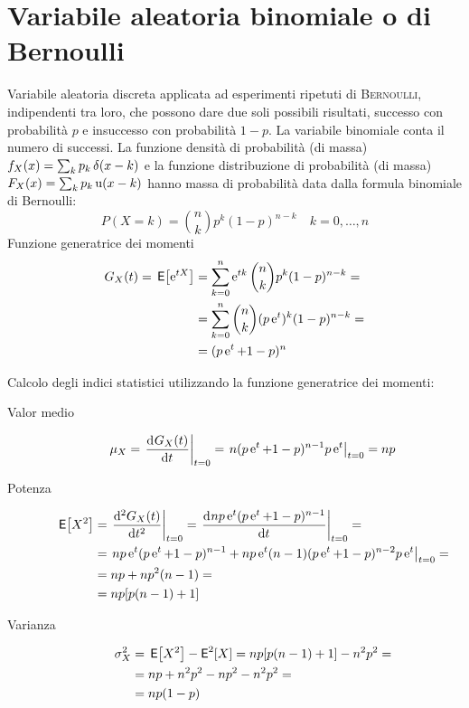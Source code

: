 \section{Variabile aleatoria binomiale o di Bernoulli}
Variabile aleatoria discreta applicata ad esperimenti ripetuti di \textsc{Bernoulli}, indipendenti tra loro, che possono dare due soli possibili risultati, successo con probabilità $p$ e insuccesso con probabilità $1-p$. La variabile binomiale conta il numero di successi.
La funzione densità di probabilità (di massa) $f_X(x)=\sum_k p_k \impulse(x-k)$ e la funzione distribuzione di probabilità (di massa) $F_X(x)=\sum_k p_k \step(x-k)$ hanno massa di probabilità data dalla formula binomiale di Bernoulli:
\begin{equation}
	P(X=k)=\binom{n}{k} p^k (1-p)^{n-k}\quad k=0,\dots,n
\end{equation}
Funzione generatrice dei momenti
\begin{equation}
\begin{split}
	G_X(t)=\E{\e{t X}}&=\sum_{k=0}^{n}{\e{t k}\binom{n}{k}p^k(1-p)^{n-k}}=\\
	&=\sum_{k=0}^{n}{\binom{n}{k}(p\e{t})^k(1-p)^{n-k}}=\\
	&=(p\e{t}+1-p)^n
	\end{split}
\end{equation}
\begin{flushleft}
Calcolo degli indici statistici utilizzando la funzione generatrice dei momenti:
\end{flushleft}
\begin{description}
\item[Valor medio]
\begin{equation}
	\mu_X=\restrict{\deriv{G_X(t)}{t}}{t=0}=\restrict{n(p\e{t}+1-p)^{n-1}p\e{t}}{t=0}=n p
\end{equation}
\item[Potenza]
\begin{equation}
\begin{split}
	\E{X^2}&=\restrict{\deriv[2]{G_X(t)}{t}}{t=0}=\restrict{\deriv{np\e{t}(p\e{t}+1-p)^{n-1}}{t}}{t=0}=\\
	&=\restrict{np\e{t}(p\e{t}+1-p)^{n-1}+np\e{t}(n-1)(p\e{t}+1-p)^{n-2}p\e{t}}{t=0}=\\
	&=np+np^2(n-1)=\\
	&=np[p(n-1)+1]
\end{split}
\end{equation}
\item[Varianza]
\begin{equation}
\begin{split}
	\sigma^2_X&=\E{X^2}-\Esp^2[X]=np[p(n-1)+1]-n^2p^2=\\
	&=np+n^2p^2-np^2-n^2p^2=\\
	&=np(1-p)
\end{split}
\end{equation}
\end{description}

